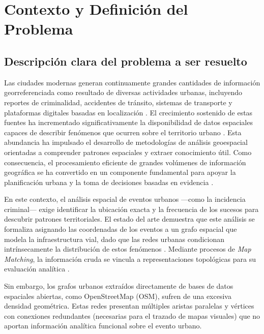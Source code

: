 \chapter{Contexto y Definición del Problema}
% 

\section{Descripción clara del problema a ser resuelto}

Las ciudades modernas generan continuamente grandes cantidades de información georreferenciada como resultado de diversas actividades urbanas, incluyendo reportes de criminalidad, accidentes de tránsito, sistemas de transporte y plataformas digitales basadas en localización \cite{huang2021analytics, ramirez2021sensors, kamrowska2021impact}. El crecimiento sostenido de estas fuentes ha incrementado significativamente la disponibilidad de datos espaciales capaces de describir fenómenos que ocurren sobre el territorio urbano \cite{huang2021analytics, avram2026advancing}. Esta abundancia ha impulsado el desarrollo de metodologías de análisis geoespacial orientadas a comprender patrones espaciales y extraer conocimiento útil. Como consecuencia, el procesamiento eficiente de grandes volúmenes de información geográfica se ha convertido en un componente fundamental para apoyar la planificación urbana y la toma de decisiones basadas en evidencia \cite{huang2021analytics, kamrowska2021impact, avram2026advancing}.

En este contexto, el análisis espacial de eventos urbanos —como la incidencia criminal— exige identificar la ubicación exacta y la frecuencia de los sucesos para descubrir patrones territoriales. El estado del arte demuestra que este análisis se formaliza asignando las coordenadas de los eventos a un grafo espacial que modela la infraestructura vial, dado que las redes urbanas condicionan intrínsecamente la distribución de estos fenómenos \cite{kozhabek2025multi, yap2023urbanity}. Mediante procesos de \textit{Map Matching}, la información cruda se vincula a representaciones topológicas para su evaluación analítica \cite{xue2022quantifying}.

Sin embargo, los grafos urbanos extraídos directamente de bases de datos espaciales abiertas, como OpenStreetMap (OSM), sufren de una excesiva densidad geométrica. Estas redes presentan múltiples aristas paralelas y vértices con conexiones redundantes (necesarias para el trazado de mapas visuales) que no aportan información analítica funcional sobre el evento urbano.

